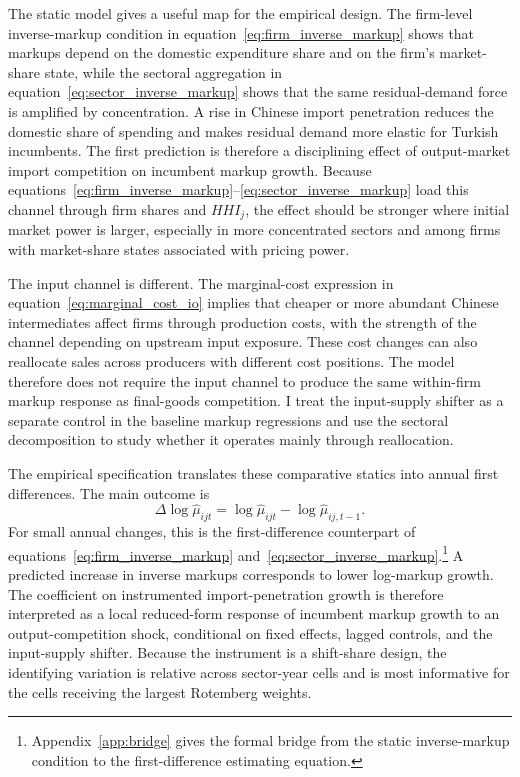 \documentclass[12pt]{article}
\begin{document}
The static model gives a useful map for the empirical design. The firm-level inverse-markup condition in equation~\eqref{eq:firm_inverse_markup} shows that markups depend on the domestic expenditure share and on the firm's market-share state, while the sectoral aggregation in equation~\eqref{eq:sector_inverse_markup} shows that the same residual-demand force is amplified by concentration. A rise in Chinese import penetration reduces the domestic share of spending and makes residual demand more elastic for Turkish incumbents. The first prediction is therefore a disciplining effect of output-market import competition on incumbent markup growth. Because equations~\eqref{eq:firm_inverse_markup}--\eqref{eq:sector_inverse_markup} load this channel through firm shares and \(HHI_j\), the effect should be stronger where initial market power is larger, especially in more concentrated sectors and among firms with market-share states associated with pricing power.

The input channel is different. The marginal-cost expression in equation~\eqref{eq:marginal_cost_io} implies that cheaper or more abundant Chinese intermediates affect firms through production costs, with the strength of the channel depending on upstream input exposure. These cost changes can also reallocate sales across producers with different cost positions. The model therefore does not require the input channel to produce the same within-firm markup response as final-goods competition. I treat the input-supply shifter as a separate control in the baseline markup regressions and use the sectoral decomposition to study whether it operates mainly through reallocation.

The empirical specification translates these comparative statics into annual first differences. The main outcome is
\[
\Delta \log \hat\mu_{ijt}
=
\log \hat\mu_{ijt} - \log \hat\mu_{ij,t-1}.
\]
For small annual changes, this is the first-difference counterpart of equations~\eqref{eq:firm_inverse_markup} and~\eqref{eq:sector_inverse_markup}.\footnote{Appendix~\ref{app:bridge} gives the formal bridge from the static inverse-markup condition to the first-difference estimating equation.} A predicted increase in inverse markups corresponds to lower log-markup growth. The coefficient on instrumented import-penetration growth is therefore interpreted as a local reduced-form response of incumbent markup growth to an output-competition shock, conditional on fixed effects, lagged controls, and the input-supply shifter. Because the instrument is a shift-share design, the identifying variation is relative across sector-year cells and is most informative for the cells receiving the largest Rotemberg weights.
\end{document}
